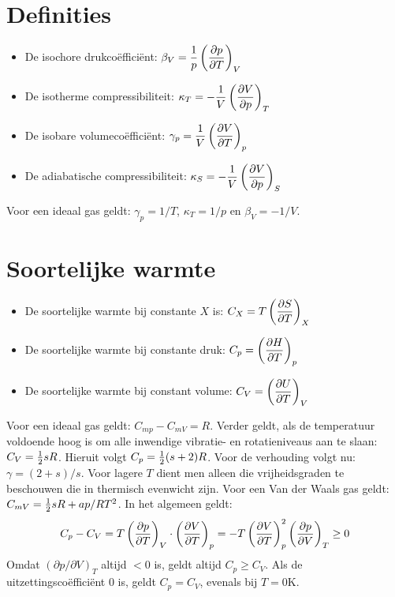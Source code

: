 \documentclass[twoside]{report}
\begin{document}
\section{Definities}
\begin{itemize}
\item De isochore drukco\"effici\"ent: $\displaystyle \beta_V=\frac{1}{p}\left(\frac{\partial p}{\partial T}\right)_{V}$
\item De isotherme compressibiliteit: $\displaystyle \kappa_T=-\frac{1}{V}\left(\frac{\partial V}{\partial p}\right)_{T}$
\item De isobare volumeco\"effici\"ent: $\displaystyle \gamma_p=\frac{1}{V}\left(\frac{\partial V}{\partial T}\right)_{p}$
\item De adiabatische compressibiliteit: $\displaystyle \kappa_S=-\frac{1}{V}\left(\frac{\partial V}{\partial p}\right)_{S}$
\end{itemize}
Voor een ideaal gas geldt: $\gamma_p=1/T$, $\kappa_T=1/p$ en $\beta_V=-1/V$.

\section{Soortelijke warmte}
\begin{itemize}
\item De soortelijke warmte bij constante $X$ is: $\displaystyle C_X=T\left(\frac{\partial S}{\partial T}\right)_{X}$
\item De soortelijke warmte bij constante druk: $\displaystyle C_p=\left(\frac{\partial H}{\partial T}\right)_{p}$
\item De soortelijke warmte bij constant volume: $\displaystyle C_V=\left(\frac{\partial U}{\partial T}\right)_{V}$
\end{itemize}
Voor een ideaal gas geldt: $C_{mp}-C_{mV}=R$. Verder geldt, als de
temperatuur voldoende hoog is om alle inwendige vibratie- en rotatieniveaus
aan te slaan: $C_V=\mbox{$\frac{1}{2}$} sR$. Hieruit volgt $C_p=\mbox{$\frac{1}{2}$}(s+2)R$. Voor de
verhouding volgt nu: $\gamma=(2+s)/s$. Voor lagere $T$ dient men alleen die
vrijheidsgraden te beschouwen die in thermisch evenwicht zijn. Voor een Van
der Waals gas geldt: $C_{mV}=\mbox{$\frac{1}{2}$} sR+ap/RT^2$.
\npar
In het algemeen geldt:
\[
C_p-C_V=T\left(\frac{\partial p}{\partial T}\right)_{V}\cdot\left(\frac{\partial V}{\partial T}\right)_{p}=-T\left(\frac{\partial V}{\partial T}\right)_{p}^2\left(\frac{\partial p}{\partial V}\right)_{T}\geq0
\]
Omdat $(\partial p/\partial V)_T$ altijd $<0$ is, geldt altijd $C_p\geq C_V$.
Als de uitzettingsco\"effici\"ent 0 is, geldt $C_p=C_V$, evenals bij $T=0$K.
\end{document}

